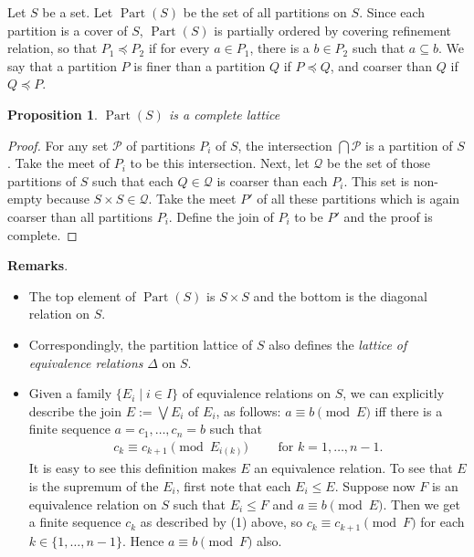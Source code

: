 \documentclass[12pt]{article}
\newtheorem{prop}{Proposition}
\begin{document}
Let $S$ be a set.  Let $\operatorname{Part}(S)$ be the set of all partitions on $S$.  Since each partition is a cover of $S$, $\operatorname{Part}(S)$ is partially ordered by covering refinement relation, so that $P_1\preceq P_2$ if for every $a\in P_1$, there is a $b\in P_2$ such that $a\subseteq b$.  We say that a partition $P$ is finer than a partition $Q$ if $P\preceq Q$, and coarser than $Q$ if $Q\preceq P$.

\begin{prop} $\operatorname{Part}(S)$ is a complete lattice \end{prop}
\begin{proof}
For any set $\mathcal{P}$ of partitions $P_i$ of $S$, the intersection $\bigcap \mathcal{P}$ is a partition of $S$.  Take the meet of $P_i$ to be this intersection.  Next, let $\mathcal{Q}$ be the set of those partitions of $S$ such that each $Q\in \mathcal{Q}$ is coarser than each $P_i$.  This set is non-empty because $S\times S\in \mathcal{Q}$.  Take the meet $P'$ of all these partitions which is again coarser than all partitions $P_i$.  Define the join of $P_i$ to be $P'$ and the proof is complete.
\end{proof}

\textbf{Remarks}.  
\begin{itemize}
\item
The top element of $\operatorname{Part}(S)$ is $S\times S$ and the bottom is the diagonal relation on $S$.
\item
Correspondingly, the partition lattice of $S$ also defines the \emph{lattice of equivalence relations} $\Delta$ on $S$.
\item
Given a family $\lbrace E_i\mid i\in I\rbrace$ of equvialence relations on $S$, we can explicitly describe the join $E:=\bigvee E_i$ of $E_i$, as follows: $a\equiv b\pmod E$ iff there is a finite sequence $a=c_1,\ldots,c_n=b$ such that 
\begin{eqnarray}c_k\equiv c_{k+1} \pmod {E_{i(k)}}\qquad\mbox{ for }k=1,\ldots,n-1.\end{eqnarray}  It is easy to see this definition makes $E$ an equivalence relation.  To see that $E$ is the supremum of the $E_i$, first note that each $E_i\le E$.  Suppose now $F$ is an equivalence relation on $S$ such that $E_i\le F$ and $a\equiv b\pmod E$.  Then we get a finite sequence $c_k$ as described by (1) above, so $c_k\equiv c_{k+1}\pmod F$ for each $k\in \lbrace 1,\ldots,n-1\rbrace$.  Hence $a\equiv b\pmod F$ also.
\end{itemize}
\end{document}
